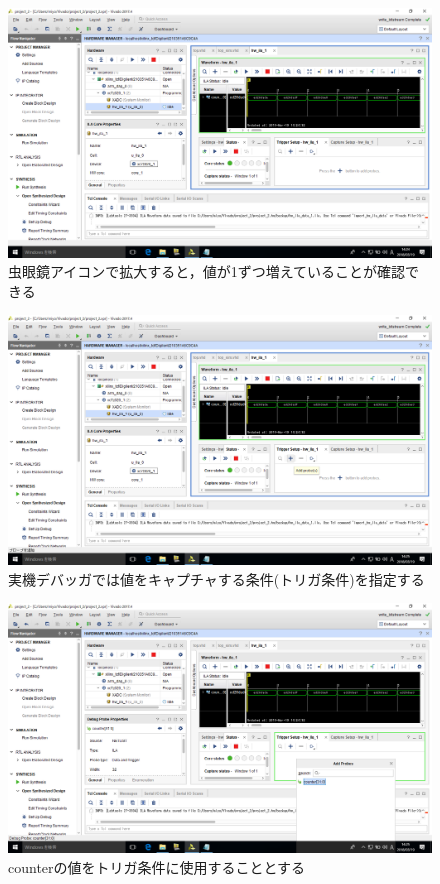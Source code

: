 \documentclass[a4paper,dvipdfmx]{jsarticle}
\begin{document}
 \begin{figure}[H]
  \begin{center}
   \includegraphics[width=.8\textwidth]{chapter05_figures/VirtualBox_Windows10_19_03_2018_14_25_07.png}
  \end{center}
  \caption{虫眼鏡アイコンで拡大すると，値が1ずつ増えていることが確認できる}
 \end{figure}

 \begin{figure}[H]
  \begin{center}
   \includegraphics[width=.8\textwidth]{chapter05_figures/VirtualBox_Windows10_19_03_2018_14_25_21.png}
  \end{center}
  \caption{実機デバッガでは値をキャプチャする条件(トリガ条件)を指定する}
 \end{figure}

 \begin{figure}[H]
  \begin{center}
   \includegraphics[width=.8\textwidth]{chapter05_figures/VirtualBox_Windows10_19_03_2018_14_25_27.png}
  \end{center}
  \caption{counterの値をトリガ条件に使用することとする}
 \end{figure}
\end{document}
